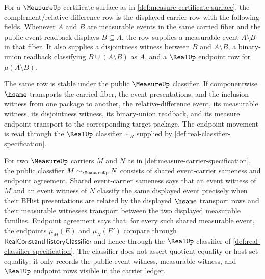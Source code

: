 \begin{definition}
\label{def:measure-complement-difference-row}
For a $\MeasureUp$ certificate surface as in
\autoref{def:measure-certificate-surface}, the complement/relative-difference
row is the displayed carrier row with the following fields. Whenever
$A$ and $B$ are measurable events in the same carried fiber and the public
event readback displays $B\subseteq A$, the row supplies a measurable event
$A\setminus B$ in that fiber. It also supplies a disjointness witness between
$B$ and $A\setminus B$, a binary-union readback classifying
$B\cup(A\setminus B)$ as $A$, and a $\RealUp$ endpoint row for
$\mu(A\setminus B)$.

The same row is stable under the public $\MeasureUp$ classifier. If
componentwise $\hsame$ transports the carried fiber, the event presentations,
and the inclusion witness from one package to another, the relative-difference
event, its measurable witness, its disjointness witness, its binary-union
readback, and its measure endpoint transport to the corresponding target
package. The endpoint movement is read through the $\RealUp$ classifier
$\sim_R$ supplied by \autoref{def:real-classifier-specification}.
\end{definition}

\begin{definition}
\label{def:measure-classifier-specification}
For two $\MeasureUp$ carriers $M$ and $N$ as in \autoref{def:measure-carrier-specification}, the public classifier $M\sim_{\MeasureUp}N$ consists of shared event-carrier sameness and endpoint agreement. Shared event-carrier sameness says that an event witness of $M$ and an event witness of $N$ classify the same displayed event precisely when their BHist presentations are related by the displayed $\hsame$ transport rows and their measurable witnesses transport between the two displayed measurable families. Endpoint agreement says that, for every such shared measurable event, the endpoints $\mu_M(E)$ and $\mu_N(E')$ compare through $\mathsf{RealConstantHistoryClassifier}$ and hence through the $\RealUp$ classifier of \autoref{def:real-classifier-specification}. The classifier does not assert quotient equality or host set equality; it only records the public event witness, measurable witness, and $\RealUp$ endpoint rows visible in the carrier ledger.
\end{definition}

